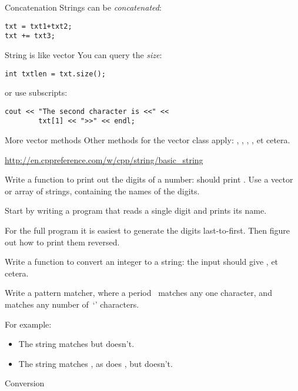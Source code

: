 \begin{block}{Concatenation}
  \label{sl:string-plus}
  Strings can be \emph{concatenated}:
\begin{verbatim}
txt = txt1+txt2;
txt += txt3;
\end{verbatim}
\end{block}

\begin{block}{String is like vector}
  \label{sl:string-vector}
  You can query the \emph{size}:
\begin{verbatim}
int txtlen = txt.size();
\end{verbatim}
or use subscripts:
\begin{verbatim}
cout << "The second character is <<" << 
        txt[1] << ">>" << endl;
\end{verbatim}
\end{block}

\begin{block}{More vector methods}
  \label{sl:string-vector-methods}
  Other methods for the vector class apply: , ,
  , , et cetera.

  \url{http://en.cppreference.com/w/cpp/string/basic_string}
\end{block}

\begin{exercise}
  \label{ex:printdigits}
  Write a function to print out the digits of a number:  should
  print . Use a vector or array of strings, containing
  the names of the digits.

  Start by writing a program that reads a single digit and prints its name.

  For the full program it is easiest to generate the  digits last-to-first.
  Then figure out how to print them reversed.
\end{exercise}

\begin{exercise}
  \label{ex:printnumber}
  Write a function to convert an integer to a string: the input
   should give , et cetera.
\end{exercise}

\begin{exercise}
  Write a pattern matcher, where a period~ matches any one
  character, and  matches any number of~`' characters.

  For example:
  \begin{itemize}
  \item The string  matches  but  doesn't.
  \item The string  matches , as does , but
     doesn't.
  \end{itemize}
\end{exercise}

 {Conversion}




